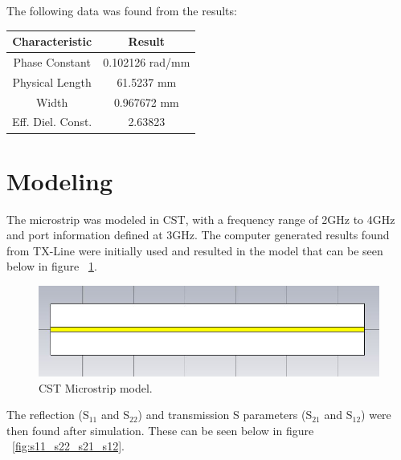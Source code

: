 \documentclass{paper}
\begin{document}
The following data was found from the results:

\begin{center}
	\begin{tabular}{c|c}
		\hline
		Characteristic & Result\\\hline\hline
		Phase Constant & 0.102126 rad/mm\\\hline
		Physical Length & 61.5237 mm\\	\hline
		Width & 0.967672 mm\\\hline
		Eff. Diel. Const. & 2.63823\\\hline
	\end{tabular}
\end{center}

\newpage
\section{Modeling}
\label{sec:CST}
The microstrip was modeled in CST, with a frequency range of 2GHz to 4GHz and port information defined at 3GHz. The computer generated results found from TX-Line were initially used and resulted in the model that can be seen below in figure ~\ref{fig:stripline1}.\\

\begin{figure}[H]
	\centering
	\includegraphics[scale=0.5]{IMG/CSTStripline}
	\caption{CST Microstrip model.}
	\label{fig:stripline1}
\end{figure}

The reflection (S$_{11}$ and S$_{22}$) and transmission S parameters (S$_{21}$ and S$_{12}$) were then found after simulation. These can be seen below in figure ~\ref{fig:s11_s22_s21_s12}.
\end{document}
